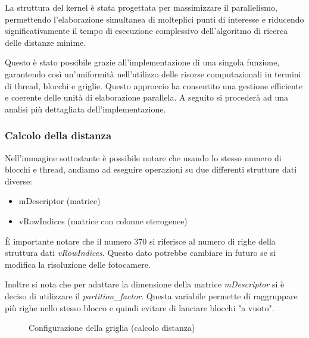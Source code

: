 \documentclass[12pt,a4paper]{report}
\begin{document}
La struttura del kernel è stata progettata per massimizzare il parallelismo, permettendo l'elaborazione simultanea di molteplici punti di interesse e riducendo significativamente il tempo di esecuzione complessivo dell'algoritmo di ricerca delle distanze minime.

Questo è stato possibile grazie  all'implementazione di una singola funzione, garantendo così un'uniformità nell'utilizzo delle risorse computazionali in termini di thread, blocchi e griglie. Questo approccio ha consentito una gestione efficiente e coerente delle unità di elaborazione parallela.
A seguito si procederà ad una analisi più dettagliata dell'implementazione.

\subsubsection{Calcolo della distanza}

Nell'immagine sottostante è possibile notare che usando lo stesso numero di blocchi e thread, andiamo ad eseguire operazioni su due differenti strutture dati diverse:

\begin{itemize}
    \item mDescriptor (matrice)
    \item vRowIndices (matrice con colonne eterogenee)
\end{itemize}

È importante notare che il numero 370 si riferisce al numero di righe della struttura dati \textit{vRowIndices}. Questo dato potrebbe cambiare in futuro se si modifica la risoluzione delle fotocamere. 

Inoltre si nota che per adattare la dimensione della matrice \textit{mDescriptor} si è deciso di utilizzare il \textit{partition\_factor}. Questa variabile permette di raggruppare più righe nello stesso blocco e quindi evitare di lanciare blocchi "a vuoto".

\begin{figure}[H]
    \centering
    \caption{Configurazione della griglia (calcolo distanza) }
\end{figure}
\end{document}
